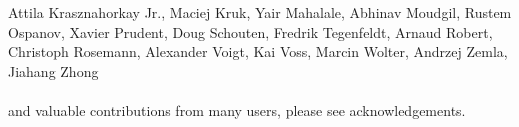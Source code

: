 \begin{center}
{Attila Krasznahorkay Jr., %
Maciej Kruk, %
Yair Mahalale, %
Abhinav Moudgil, %
Rustem Ospanov, %
Xavier Prudent, %
Doug Schouten, %
Fredrik Tegenfeldt, %
Arnaud Robert, %
Christoph Rosemann, %
Alexander Voigt, %
Kai Voss, %
Marcin Wolter, %
Andrzej Zemla, %
Jiahang Zhong %
\\
\hspace{0.5cm} \\
and valuable contributions from many users, please see acknowledgements.
}
\end{center}

\thispagestyle{empty}
\newpage

